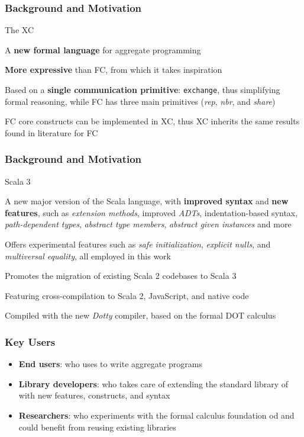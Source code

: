 \begin{frame}
    \frametitle{Background and Motivation}
    \begin{blockitems}{The \ac{XC}}
        \item A \textbf{new formal language} for aggregate programming~\cite{xc}
        \item \textbf{More expressive} than \ac{FC}, from which it takes inspiration
        \item Based on a \textbf{single communication primitive}: \texttt{exchange}, thus simplifying formal reasoning, while \ac{FC} has three main primitives (\textit{rep}, \textit{nbr}, and \textit{share})
        \item \ac{FC} core constructs can be implemented in \ac{XC}, thus \ac{XC} inherits the same results found in literature for \ac{FC}
    \end{blockitems}
\end{frame}

\begin{frame}
    \frametitle{Background and Motivation}
    \begin{blockitems}{Scala 3}
        \item A new major version of the Scala language, with \textbf{improved syntax} and \textbf{new features}, such as \textit{extension methods}, improved \textit{\acp{ADT}}, indentation-based syntax, \textit{path-dependent types}, \textit{abstract type members}, \textit{abstract given instances} and more
        \item Offers experimental features such as \textit{safe initialization}, \textit{explicit nulls}, and \textit{multiversal equality}, all employed in this work
        \item Promotes the migration of existing Scala 2 codebases to Scala 3
        \item Featuring cross-compilation to Scala 2, JavaScript, and native code
        \item Compiled with the new \textit{Dotty} compiler, based on the formal \ac{DOT} calculus
    \end{blockitems}
\end{frame}

\begin{frame}
    \frametitle{Key Users}
    \begin{itemize}
        \item \textbf{End users}: who uses \this to write aggregate programs
        \item \textbf{Library developers}: who takes care of extending the standard library of \this with new features, constructs, and syntax
        \item \textbf{Researchers}: who experiments with the formal calculus foundation od \this and could benefit from reusing existing libraries
    \end{itemize}
\end{frame}

